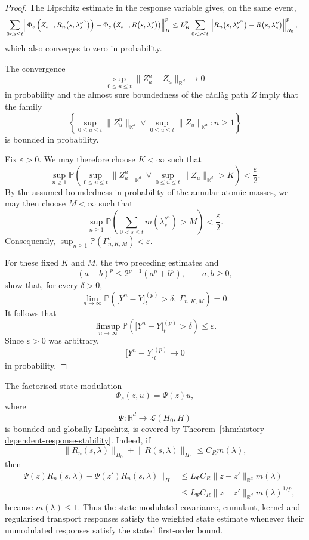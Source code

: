 \documentclass[a4paper,10pt]{article}
\renewcommand{\P}{\mathbb P}
\begin{document}
\begin{proof}
The Lipschitz estimate in the response variable gives, on the same
event,
\[
\begin{aligned}
&\sum_{0<s\le t}
\Bigl\lVert
\Phi_s\left(
Z_{s-},
R_n\bigl(s,\lambda_s^{\nu^n}\bigr)
\right)
-
\Phi_s\left(
Z_{s-},
R\bigl(s,\lambda_s^\nu\bigr)
\right)
\Bigr\rVert_H^p
\le
L_K^p
\sum_{0<s\le t}
\left\lVert
R_n\bigl(s,\lambda_s^{\nu^n}\bigr)
-
R\bigl(s,\lambda_s^\nu\bigr)
\right\rVert_{H_0}^p,
\end{aligned}
\]
which also converges to zero in probability.

The convergence
\[
\sup_{0\le u\le t}
\lVert Z_u^n-Z_u\rVert_{\mathbb R^d}
\longrightarrow0
\]
in probability and the almost sure boundedness of the càdlàg path
\(Z\) imply that the family
\[
\left\{
\sup_{0\le u\le t}\lVert Z_u^n\rVert_{\mathbb R^d}
\vee
\sup_{0\le u\le t}\lVert Z_u\rVert_{\mathbb R^d}
:n\ge1
\right\}
\]
is bounded in probability.

Fix \(\varepsilon>0\). We may therefore choose \(K<\infty\) such that
\[
\sup_{n\ge1}
\P\left(
\sup_{0\le u\le t}\lVert Z_u^n\rVert_{\mathbb R^d}
\vee
\sup_{0\le u\le t}\lVert Z_u\rVert_{\mathbb R^d}
>
K
\right)
<
\frac{\varepsilon}{2}.
\]
By the assumed boundedness in probability of the annular atomic
masses, we may then choose \(M<\infty\) such that
\[
\sup_{n\ge1}
\P\left(
\sum_{0<s\le t}m(\lambda_s^{\nu^n})>M
\right)
<
\frac{\varepsilon}{2}.
\]
Consequently,
$
        \sup_{n\ge1}\P(\Gamma_{n,K,M}^c)<\varepsilon.
$

For these fixed \(K\) and \(M\), the two preceding estimates and
\[
        (a+b)^p\le2^{p-1}(a^p+b^p),
        \qquad a,b\ge0,
\]
show that, for every \(\delta>0\),
\[
\lim_{n\to\infty}
\P\left(
\bigl[Y^n-Y\bigr]^{(p)}_t>\delta,
\ \Gamma_{n,K,M}
\right)
=
0.
\]
It follows that
\[
\limsup_{n\to\infty}
\P\left(
\bigl[Y^n-Y\bigr]^{(p)}_t>\delta
\right)
\le
\varepsilon.
\]
Since \(\varepsilon>0\) was arbitrary,
\[
        \bigl[Y^n-Y\bigr]^{(p)}_t
        \longrightarrow0
\]
in probability.
\end{proof}

The factorised state modulation
\[
        \Phi_s(z,u)=\Psi(z)u,
\]
where
\[
        \Psi:\mathbb R^d\longrightarrow\mathcal L(H_0,H)
\]
is bounded and globally Lipschitz, is covered by
Theorem~\ref{thm:history-dependent-response-stability}. Indeed, if
\[
\lVert R_n(s,\lambda)\rVert_{H_0}
+
\lVert R(s,\lambda)\rVert_{H_0}
\le
C_Rm(\lambda),
\]
then
\[
\begin{aligned}
\lVert
\Psi(z)R_n(s,\lambda)
-
\Psi(z')R_n(s,\lambda)
\rVert_H
&\le
L_\Psi C_R
\lVert z-z'\rVert_{\mathbb R^d}
m(\lambda)
\\
&\le
L_\Psi C_R
\lVert z-z'\rVert_{\mathbb R^d}
m(\lambda)^{1/p},
\end{aligned}
\]
because \(m(\lambda)\le1\). Thus the state-modulated covariance,
cumulant, kernel and regularised transport responses satisfy the
weighted state estimate whenever their unmodulated responses satisfy
the stated first-order bound.
\end{document}
